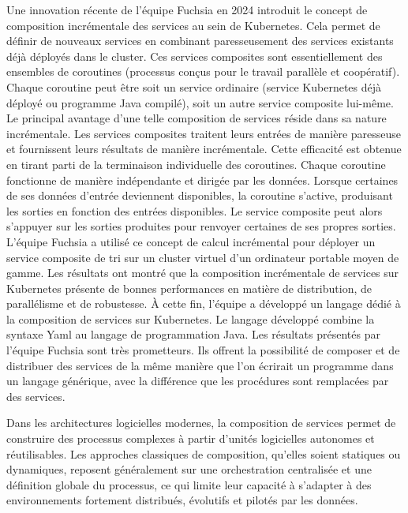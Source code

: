 Une innovation récente de l’équipe Fuchsia en 2024 \cite{ngoufo2024} introduit le concept de composition incrémentale des services au sein de Kubernetes. Cela permet de définir de nouveaux services en combinant paresseusement des services existants déjà déployés dans le cluster. Ces services composites sont essentiellement des ensembles de coroutines (processus conçus pour le travail parallèle et coopératif). Chaque coroutine peut être soit un service ordinaire (service Kubernetes déjà déployé ou programme Java compilé), soit un autre service composite lui-même. Le principal avantage d’une telle composition de services réside dans sa nature incrémentale. Les services composites traitent leurs entrées de manière paresseuse et fournissent leurs résultats de manière incrémentale. Cette efficacité est obtenue en tirant parti de la terminaison individuelle des coroutines. Chaque coroutine fonctionne de manière indépendante et dirigée par les données. Lorsque certaines de ses données d’entrée deviennent disponibles, la coroutine s’active, produisant les sorties en fonction des entrées disponibles. Le service composite peut alors s’appuyer sur les sorties produites pour renvoyer certaines de ses propres sorties. L’équipe Fuchsia a utilisé ce concept de calcul incrémental pour déployer un service composite de tri sur un cluster virtuel d’un ordinateur portable moyen de gamme. Les résultats ont montré que la composition incrémentale de services sur Kubernetes présente de bonnes performances en matière de distribution, de parallélisme et de robustesse. À cette fin, l’équipe a développé un langage dédié à la composition de services sur Kubernetes. Le langage développé combine la syntaxe Yaml au langage de programmation Java. Les résultats présentés par l’équipe Fuchsia sont très prometteurs. Ils offrent la possibilité de composer et de distribuer des services de la même manière que l’on écrirait un programme dans un langage générique, avec la différence que les procédures sont remplacées par des services.


Dans les architectures logicielles modernes, la composition de services permet de construire des processus complexes à partir d’unités logicielles autonomes et réutilisables. Les approches classiques de composition, qu’elles soient statiques ou dynamiques, reposent généralement sur une orchestration centralisée et une définition globale du processus, ce qui limite leur capacité à s’adapter à des environnements fortement distribués, évolutifs et pilotés par les données.

